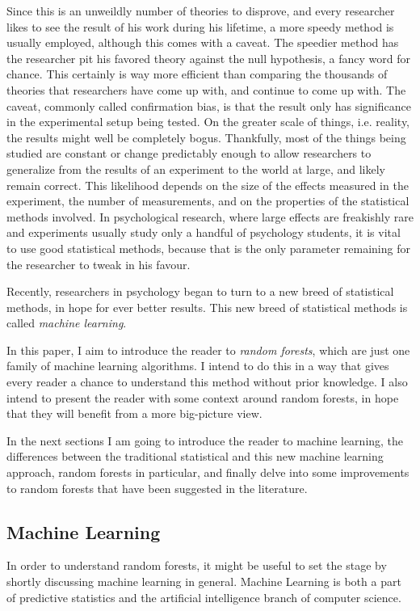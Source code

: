 \documentclass[a4paper,man,12pt,apacite]{apa6} %
\begin{document}
Since this is an unweildly number of theories to disprove, and every
researcher likes to see the result of his work during his lifetime, a
more speedy method is usually employed, although this comes with a caveat.
The speedier method has the researcher pit his favored theory against
the null hypothesis, a fancy word for chance.
This certainly is way more efficient than comparing the thousands of
theories that researchers have come up with, and continue to come up with.
The caveat, commonly called confirmation bias, is that the result only
has significance in the experimental setup being tested.
On the greater scale of things, i.e. reality, the results might well be
completely bogus.
Thankfully, most of the things being studied are constant or change
predictably enough to allow researchers to generalize from the results
of an experiment to the world at large, and likely remain correct.
This likelihood depends on the size of the effects measured in the
experiment, the number of measurements, and on the properties of the
statistical methods involved.
In psychological research, where large effects are freakishly rare and
experiments usually study only a handful of psychology students, it is
vital to use good statistical methods, because that is the only parameter
remaining for the researcher to tweak in his favour.

Recently, researchers in psychology began to turn to a new breed of
statistical methods, in hope for ever better results. This new breed of
statistical methods is called \emph{machine learning}.

In this paper, I aim to introduce the reader to \emph{random forests},
which are just one family of machine learning algorithms.
I intend to do this in a way that gives every reader a chance to understand
this method without prior knowledge. I also intend to present the reader
with some context around random forests, in hope that they will benefit
from a more big-picture view.

In the next sections I am going to introduce the reader to machine learning,
the differences between the traditional statistical and this new
machine learning approach, random forests in particular, and finally delve
into some improvements to random forests that have been suggested in the
literature.

\subsection{Machine Learning}
In order to understand random forests, it might be useful to set
the stage by shortly discussing machine learning in general.
Machine Learning is both a part of predictive statistics and the
artificial intelligence branch of computer science.
\end{document}
